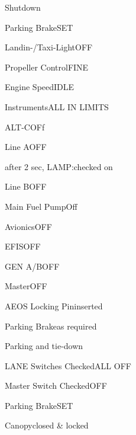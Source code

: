 \begin{checklist}{Shutdown}
  \item{Parking Brake}{SET}
  \item{Landin-/Taxi-Light}{OFF}
  \item{Propeller Control}{FINE}
  \item{Engine Speed}{IDLE}
  \item{Instruments}{ALL IN LIMITS}
  \item{ALT-C}{OFf}
  \item{Line A}{OFF}
  \item{after 2 sec, LAMP:}{checked on}
  \item{Line B}{OFF}
  \item{Main Fuel Pump}{Off}
  \item{Avionics}{OFF}
  \item{EFIS}{OFF}
  \item{GEN A/B}{OFF}
  \item{Master}{OFF}
  \item{AEOS Locking Pin}{inserted}
  \item{Parking Brake}{as required}
\end{checklist}

\begin{checklist}{Parking and tie-down}
  \item{LANE Switches Checked}{ALL OFF}
  \item{Master Switch Checked}{OFF}
  \item{Parking Brake}{SET}
  \item{Canopy}{closed \& locked}
\end{checklist}


